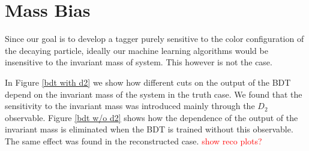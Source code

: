 \documentclass[10pt,a4paper]{book}
\newcommand\todo[1]{\textcolor{red}{#1}}
\begin{document}
\section{Mass Bias}

Since our goal is to develop a tagger purely sensitive to the color configuration of the decaying particle, ideally our machine learning algorithms would be insensitive to the invariant mass of system. This however is not the case.

In Figure \ref{bdt with d2} we show how different cuts on the output of the BDT depend on the invariant mass of the system in the truth case. We found that the sensitivity to the invariant mass was introduced mainly through the $D_2$ observable. Figure \ref{bdt w/o d2} shows how the dependence of the output of the invariant mass is eliminated when the BDT is trained without this observable. The same effect was found in the reconstructed case. \todo{show reco plots?}
\end{document}
